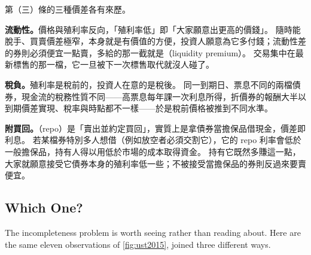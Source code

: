 \begin{note}
	第（三）條的三種價差各有來歷。

	\textbf{流動性。}價格與殖利率反向，「殖利率低」即「大家願意出更高的價錢」。
	隨時能脫手、買賣價差極窄，本身就是有價值的方便，投資人願意為它多付錢；流動性差的券則必須便宜一點賣，多給的那一截就是（liquidity premium）。
	交易集中在最新標售的那一檔，它一旦被下一次標售取代就沒人碰了。

	\textbf{稅負。}殖利率是稅前的，投資人在意的是稅後。
	同一到期日、票息不同的兩檔債券，現金流的稅務性質不同——高票息每年課一次利息所得，折價券的報酬大半以到期價差實現、稅率與時點都不一樣——於是稅前價格被推到不同水準。

	\textbf{附買回。}（repo）是「賣出並約定買回」，實質上是拿債券當擔保品借現金，價差即利息。
	若某檔券特別多人想借（例如放空者必須交割它），它的 repo 利率會低於一般擔保品，持有人得以用低於市場的成本取得資金。
	持有它既然多賺這一點，大家就願意接受它債券本身的殖利率低一些；不被接受當擔保品的券則反過來要賣便宜。
\end{note}
\suppend

\subsection{Which One?}


The incompleteness problem is worth seeing rather than reading about.
Here are the same eleven observations of \autoref{fig:ust2015}, joined three different ways.

